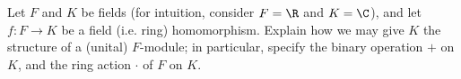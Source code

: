 %
%

\noindent{}Let $F$ and $K$ be fields (for intuition, consider $F = \R$ and $K = \C$), and let $f : F \rightarrow K$ be a field (i.e. ring) homomorphism. Explain how we may give $K$ the structure of a (unital) $F$-module; in particular, specify the binary operation $+$ on $K$, and the ring action $\cdot$ of $F$ on $K$.